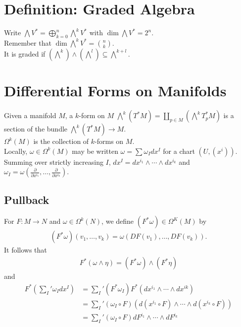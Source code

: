 \documentclass[11pt]{article}
\begin{document}
\section*{Definition: Graded Algebra}
\label{sec:org58d896e}
Write \(\bigwedge V^{*}=\bigoplus_{k=0}^{n}\bigwedge^{k}V^{*}\) with \(\operatorname{dim}\bigwedge V^{*}=2^{n}\).\\
Remember that \(\operatorname{dim}\bigwedge^{k}V^{*}=\binom{n}{k}\).\\
It is graded if \((\bigwedge^{k})\wedge(\bigwedge^{l})\subseteq\bigwedge^{k+l}\).\\
\section*{Differential Forms on Manifolds}
\label{sec:org57fdcf2}
Given a manifold \(M\), a \(k\)-form on \(M\) \(\bigwedge^{k}(T^{*}M)=\coprod_{p\in M}\left( \bigwedge^{k}T_{p}^{*}M \right)\) is a section of the bundle \(\bigwedge^{k}(T^{*}M)\to M\).\\
\(\Omega^{k}(M)\) is the collection of \(k\)-forms on \(M\).\\
Locally, \(\omega\in\Omega^{k}(M)\) may be written \(\omega=\sum\omega_{I}dx^{I}\) for a chart \((U,(x^{i}))\).\\
Summing over strictly increasing \(I\), \(dx^{I}=dx^{i_{1}}\wedge\cdots\wedge dx^{i_{k}}\) and \(\omega_{I}=\omega\left( \frac{\partial}{\partial x^{i_{1}}},\ldots,\frac{\partial}{\partial x^{i_{k}}} \right)\).\\
\subsection*{Pullback}
\label{sec:orgaffff83}
For \(F:M\to N\) and \(\omega\in\Omega^{k}(N)\), we define \((F^{*}\omega)\in\Omega^{K}(M)\) by\\
\begin{align*}
  (F^{*}\omega)(v_{1},\ldots,v_{k})=\omega(DF(v_{1}),\ldots,DF(v_{k})).
\end{align*}
It follows that\\
\begin{align*}
  F^{*}(\omega\wedge\eta)
  =(F^{*}\omega)\wedge(F^{*}\eta)
\end{align*}
and\\
\begin{align*}
  F^{*}\left( \sum_{I}'\omega_{I}dx^{I} \right)
  &=\sum_{I}'(F^{*}\omega_{I})F^{*}(dx^{i_{1}}\wedge\cdots\wedge dx^{ik}) \\
  &=\sum_{I}'(\omega_{I}\circ F)(d(x^{i_{1}}\circ F)\wedge\cdots\wedge d(x^{i_{k}}\circ F)) \\
  &=\sum_{I}'(\omega_{I}\circ F)dF^{i_{1}}\wedge\cdots\wedge dF^{i_{k}}
\end{align*}
\end{document}
